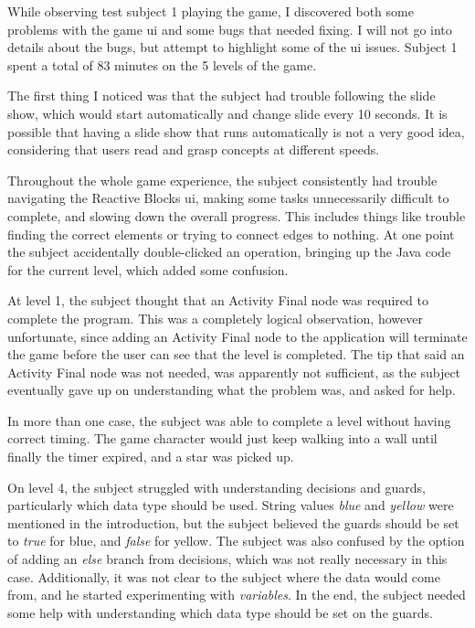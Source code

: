 \noindent
While observing test subject 1 playing the game, I discovered both some problems with the game \gls{ui} and some bugs that needed fixing. I will not go into details about the bugs, but attempt to highlight some of the \gls{ui} issues. Subject 1 spent a total of 83 minutes on the 5 levels of the game.

\noindent
The first thing I noticed was that the subject had trouble following the slide show, which would start automatically and change slide every 10 seconds. It is possible that having a slide show that runs automatically is not a very good idea, considering that users read and grasp concepts at different speeds.

\noindent
Throughout the whole game experience, the subject consistently had trouble navigating the Reactive Blocks \gls{ui}, making some tasks unnecessarily difficult to complete, and slowing down the overall progress. This includes things like trouble finding the correct elements or trying to connect edges to nothing. At one point the subject accidentally double-clicked an operation, bringing up the Java code for the current level, which added some confusion.

\noindent
At level 1, the subject thought that an Activity Final node was required to complete the program. This was a completely logical observation, however unfortunate, since adding an Activity Final node to the application will terminate the game before the user can see that the level is completed. The tip that said an Activity Final node was not needed, was apparently not sufficient, as the subject eventually gave up on understanding what the problem was, and asked for help.

\noindent
In more than one case, the subject was able to complete a level without having correct timing. The game character would just keep walking into a wall until finally the timer expired, and a star was picked up.

\noindent
On level 4, the subject struggled with understanding decisions and guards, particularly which data type should be used. String values \emph{blue} and \emph{yellow} were mentioned in the introduction, but the subject believed the guards should be set to \emph{true} for blue, and \emph{false} for yellow. The subject was also confused by the option of adding an \emph{else} branch from decisions, which was not really necessary in this case. Additionally, it was not clear to the subject where the data would come from, and he started experimenting with \emph{variables}. In the end, the subject needed some help with understanding which data type should be set on the guards.

